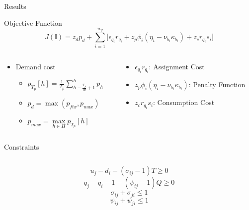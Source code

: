 \documentclass[aspectratio=169]{beamer}
\begin{document}
\begin{frame}[label={sec:org4ee59dd}]{Results}
\begin{frame}[label={sec:orged78099}]{Objective Function}
\begin{equation*}
  J(\mathbb{I}) = z_d p_d + \sum_{i=1}^{n_V} \Big[ \epsilon_{q_i}r_{q_i} + z_p \phi_i(\eta_i - \nu_{b_i} \kappa_{b_i}) + z_c r_{q_i} s_i \Big]
\end{equation*}

\begin{columns}
\begin{column}{0.5\columnwidth}
\begin{itemize}
\item Demand cost
\begin{itemize}
\item \(p_{T_p}[h] = \frac{1}{T_p} \sum_{h-\frac{T_p}{dt}+1}^h p_h\)
\item \(p_d = \max(p_{fix}, p_{max})\)
\item \(p_{max} = \max\limits_{h \in H}p_{T_p}[h]\)
\end{itemize}
\end{itemize}
\end{column}

\begin{column}{0.5\columnwidth}
\begin{itemize}
\item \(\epsilon_{q_i}r_{q_i}\): Assignment Cost
\item \(z_p \phi_i(\eta_i - \nu_{b_i} \kappa_{b_i})\): Penalty Function
\item \(z_c r_{q_i} s_i\): Consumption Cost
\end{itemize}
\end{column}
\end{columns}
\end{frame}

\begin{frame}[label={sec:org88b4215}]{Constraints}
\begin{columns}
\begin{column}{0.5\columnwidth}
\begin{equation*}
    \label{seq:c0}
    u_j - d_i - (\sigma_{ij} - 1)T \ge 0
\end{equation*}
\begin{equation*}
    \label{seq:c1}
    q_j - q_i - 1 - (\psi_{ij} - 1)Q \ge 0
\end{equation*}
\begin{equation*}
    \label{seq:c2}
    \sigma_{ij} + \sigma_{ji} \le 1
\end{equation*}
\begin{equation*}
   \label{seq:c3}
    \psi_{ij} + \psi_{ji} \le 1
\end{equation*}
\end{column}


\end{columns}
\end{frame}
\end{frame}
\end{document}
